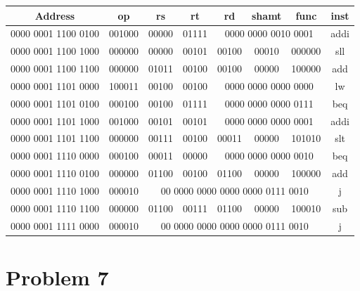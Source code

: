 \documentclass[12pt]{article}
\begin{document}
\begin{center}
        \hspace*{-1cm}
        \begin{tabular}{|c||c|c|c|c|c|c|c|}
                \hline
                Address & op & rs & rt & rd & shamt & func & inst \\
                \hline\hline
                0000 0001 1100 0100 & 001000 & 00000 & 01111 & \multicolumn{3}{|c|}{0000 0000 0010 0001} & addi\\
                \hline
                0000 0001 1100 1000 & 000000 & 00000 & 00101 & 00100 & 00010 & 000000 & sll\\
                \hline
                0000 0001 1100 1100 & 000000 & 01011 & 00100 & 00100 & 00000 & 100000& add\\
                \hline
                0000 0001 1101 0000 & 100011 & 00100 & 00100 & \multicolumn{3}{|c|}{0000 0000 0000 0000} & lw\\
                \hline
                0000 0001 1101 0100 & 000100 & 00100 & 01111 & \multicolumn{3}{|c|}{0000 0000 0000 0111} & beq\\
                \hline
                0000 0001 1101 1000 & 001000 & 00101 & 00101 & \multicolumn{3}{|c|}{0000 0000 0000 0001} & addi\\
                \hline
                0000 0001 1101 1100 & 000000 & 00111 & 00100 & 00011 & 00000 & 101010 & slt\\
                \hline
                0000 0001 1110 0000 & 000100 & 00011 & 00000 & \multicolumn{3}{|c|}{0000 0000 0000 0010} & beq\\
                \hline
                0000 0001 1110 0100 & 000000 & 01100 & 00100 & 01100 & 00000 & 100000 & add\\
                \hline
                0000 0001 1110 1000 & 000010 & \multicolumn{5}{|c|}{00 0000 0000 0000 0000 0111 0010} & j\\
                \hline
                0000 0001 1110 1100 & 000000 & 01100 & 00111 & 01100 & 00000 & 100010 & sub\\
                \hline
                0000 0001 1111 0000 & 000010 & \multicolumn{5}{|c|}{00 0000 0000 0000 0000 0111 0010} & j\\
                \hline
        \end{tabular}
        \hspace*{-1cm}
\end{center}

\section*{Problem 7}
\end{document}
